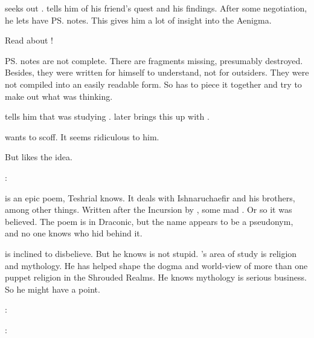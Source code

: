 \Teshrial{} seeks out . 
\Nemuragh{} tells him of his friend's quest and his findings. 
After some negotiation, he lets \Teshrial{} have \ps{\Lothagiel} notes. 
This gives him a lot of insight into the Aenigma. 

Read about !

\ps{\Lothagiel} notes are not complete. 
There are fragments missing, presumably destroyed. 
Besides, they were written for himself to understand, not for outsiders. 
They were not compiled into an easily readable form. 
So \Teshrial{} has to piece it together and try to make out what \Lothagiel{} was thinking. 

\Nemuragh{} tells him that \Lothagiel{} was studying \WanderersInDarknessEmph. 
\Teshrial{} later brings this up with \Menessiaraid. 

\begin{prose}
  \Teshrial{} wants to scoff. 
  It seems ridiculous to him. 
  
  But \Menessiaraid{} likes the idea.
  
  \Teshrial: 
  
  
  \WanderersInDarkness is an epic poem, Teshrial knows.
  It deals with Ishnaruchaefir and his brothers, among other things. 
  Written after the Incursion by \Melcryth, some mad \dragon.
  Or so it was believed.
  The poem is in Draconic, but the name \quo{\Melcryth} appears to be a pseudonym, and no one knows who hid behind it. 
  
  \Teshrial{} is inclined to disbelieve. 
  But he knows \Menessiaraid{} is not stupid.
  \Menessiaraid{}'s area of study is religion and mythology.
  He has helped shape the dogma and world-view of more than one puppet religion in the Shrouded Realms.
  He knows mythology is serious business.
  So he might have a point.
  
  \Menessiaraid:
  
  \Teshrial: 
\end{prose}

